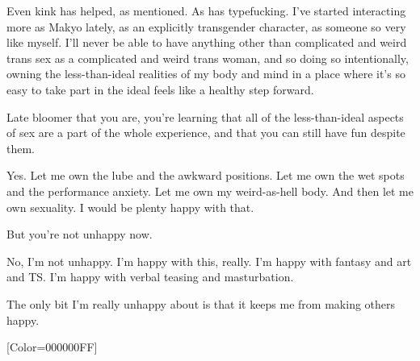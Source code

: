 \begin{paracol}{2}
\begin{leftcolumn}
Even kink has helped, as mentioned. As has typefucking. I've started interacting more as Makyo lately, as an explicitly transgender character, as someone so very like myself. I'll never be able to have anything other than complicated and weird trans sex as a complicated and weird trans woman, and so doing so intentionally, owning the less-than-ideal realities of my body and mind in a place where it's so easy to take part in the ideal feels like a healthy step forward.

\begin{ally}
Late bloomer that you are, you're learning that all of the less-than-ideal aspects of sex are a part of the whole experience, and that you can still have fun despite them.
\end{ally}
Yes. Let me own the lube and the awkward positions. Let me own the wet spots and the performance anxiety. Let me own my weird-as-hell body. And then let me own sexuality. I would be plenty happy with that.

\begin{ally}
But you're not unhappy now.
\end{ally}
No, I'm not unhappy. I'm happy with this, really. I'm happy with fantasy and art and TS. I'm happy with verbal teasing and masturbation.

The only bit I'm really unhappy about is that it keeps me from making others happy.
\newpage
\end{leftcolumn}
\end{paracol}
\resetbackgroundcolor

\renewfontfamily{}[Color=000000FF]
